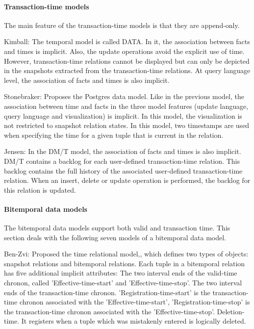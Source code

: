 \paragraph{Transaction-time models}
The main feature of the transaction-time models is that they are append-only.

Kimball: \cite{kim78} The temporal model is called DATA. In it, the association between facts and times is implicit. Also, the update operations avoid the explicit use of time. However, transaction-time relations cannot be displayed but can only be depicted in the snapshots extracted from the transaction-time relations. At query language level, the association of facts and times is also implicit.

Stonebraker: \cite{Ston87} Proposes the Postgres data model. Like in the previous model, the association between time and facts in the three model features (update language, query language and visualization) is implicit. In this model, the visualization is not restricted to snapshot relation states.
In this model, two timestamps are used when specifying the time for a given tuple that is current in the relation.

Jensen: \cite{Jensen:1991:IIM:627283.627484} In the DM/T model, the association of facts and times is also implicit. DM/T contains a backlog for each user-defined transaction-time relation. This backlog contains the full history of the associated user-defined transaction-time relation. When an insert, delete or update operation is performed, the backlog for this relation is updated.

\paragraph{Bitemporal data models}
The bitemporal data models support both valid and transaction time. This section deals with the following seven models of a bitemporal data model.

Ben-Zvi: \cite{910377} Proposed the time relational model,, which defines two types of objects: snapshot relations and bitemporal relations. Each tuple in a bitemporal relation has five additional implicit attributes:
The two interval ends of the valid-time chronon, called 'Effective-time-start' and 'Effective-time-stop'.
The two interval ends of the transaction-time chronon. 'Registration-time-start' is the transaction-time chronon associated with the 'Effective-time-start', 'Registration-time-stop' is the transaction-time chronon associated with the 'Effective-time-stop'.
Deletion-time. It registers when a tuple which was mistakenly entered is logically deleted.

